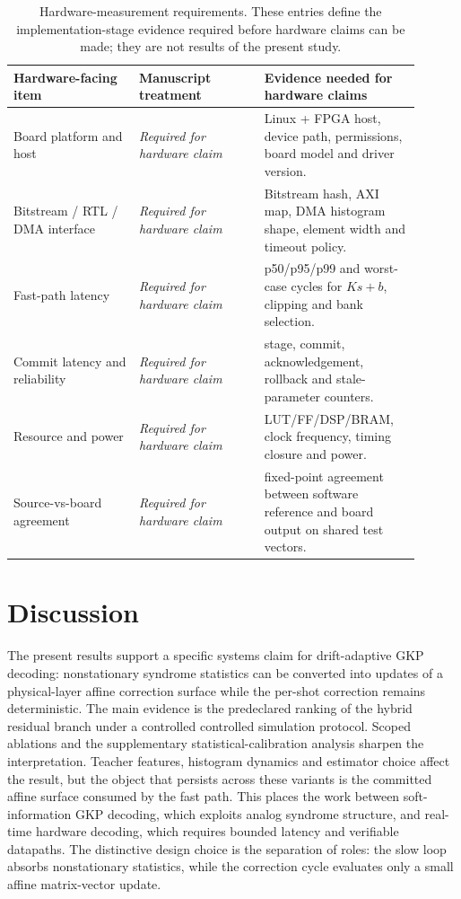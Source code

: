 \documentclass[11pt]{article}
\newcommand{\hardwareclaimrequired}{\textit{Required for hardware claim}}
\newcommand{\softwarehil}{controlled simulation}
\begin{document}
\begin{table}[t]
\centering
\small
\begin{tabular}{@{}>{\raggedright\arraybackslash}p{0.28\linewidth}>{\raggedright\arraybackslash}p{0.28\linewidth}>{\raggedright\arraybackslash}p{0.34\linewidth}@{}}
\toprule
Hardware-facing item & Manuscript treatment & Evidence needed for hardware claims \\
\midrule
Board platform and host & \hardwareclaimrequired{} & Linux + FPGA host,
device path, permissions, board model and driver version. \\
\addlinespace
Bitstream / RTL / DMA interface & \hardwareclaimrequired{} & Bitstream hash,
AXI map, DMA histogram shape, element width and timeout policy. \\
\addlinespace
Fast-path latency & \hardwareclaimrequired{} & p50/p95/p99 and worst-case
cycles for \(Ks+b\), clipping and bank selection. \\
\addlinespace
Commit latency and reliability & \hardwareclaimrequired{} & stage, commit,
acknowledgement, rollback and stale-parameter counters. \\
\addlinespace
Resource and power & \hardwareclaimrequired{} & LUT/FF/DSP/BRAM, clock
frequency, timing closure and power. \\
\addlinespace
Source-vs-board agreement & \hardwareclaimrequired{} & fixed-point
agreement between software reference and board output on shared test vectors. \\
\bottomrule
\end{tabular}
\caption{Hardware-measurement requirements.  These entries define the
implementation-stage evidence required before hardware claims can be made;
they are not results of the present study.}
\label{tab:hardware-plan}
\end{table}

\section{Discussion}

The present results support a specific systems claim for drift-adaptive GKP
decoding: nonstationary syndrome statistics can be converted into updates of a
physical-layer affine correction surface while the per-shot correction remains
deterministic.  The main evidence is the predeclared ranking of the hybrid
residual branch under a controlled \softwarehil{} protocol.  Scoped ablations
and the supplementary statistical-calibration analysis sharpen the
interpretation.  Teacher features, histogram dynamics and estimator choice
affect the result, but the object that persists across these variants is the
committed affine surface consumed by the fast path.  This places the work
between soft-information GKP decoding, which exploits analog syndrome
structure, and real-time hardware decoding, which requires bounded latency and
verifiable datapaths.  The distinctive design choice is the separation of
roles: the slow loop absorbs nonstationary statistics, while the correction
cycle evaluates only a small affine matrix-vector update.
\end{document}
